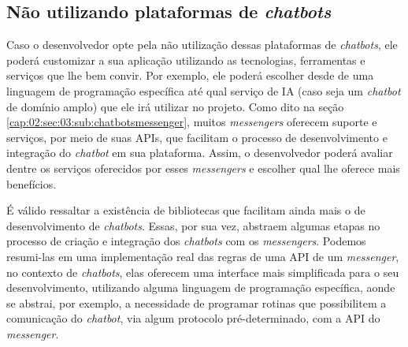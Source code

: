 \subsection{Não utilizando plataformas de \textit{chatbots}}

Caso o desenvolvedor opte pela não utilização dessas plataformas de \textit{chatbots}, ele poderá customizar a sua aplicação utilizando as tecnologias, ferramentas e serviços que lhe bem convir.
Por exemplo, ele poderá escolher desde de uma linguagem de programação específica até qual serviço de IA (caso seja um \textit{chatbot} de domínio amplo) que ele irá utilizar no projeto.
Como dito na seção \ref{cap:02:sec:03:sub:chatbotsmessenger}, muitos \textit{messengers} oferecem suporte e serviços, por meio de suas APIs, que facilitam o processo de desenvolvimento e integração do \textit{chatbot} em sua plataforma.
Assim, o desenvolvedor poderá avaliar dentre os serviços oferecidos por esses \textit{messengers} e escolher qual lhe oferece mais benefícios.

É válido ressaltar a existência de bibliotecas que facilitam ainda mais o de desenvolvimento de \textit{chatbots}.
Essas, por sua vez, abstraem algumas etapas no processo de criação e integração dos \textit{chatbots} com os \textit{messengers}.
Podemos resumi-las em uma implementação real das regras de uma API de um \textit{messenger}, no contexto de \textit{chatbots}, elas oferecem uma interface mais simplificada para o seu desenvolvimento, utilizando alguma linguagem de programação específica, aonde se abstrai, por exemplo, a necessidade de programar rotinas que possibilitem a comunicação do \textit{chatbot}, via algum protocolo pré-determinado, com a API do \textit{messenger}.
